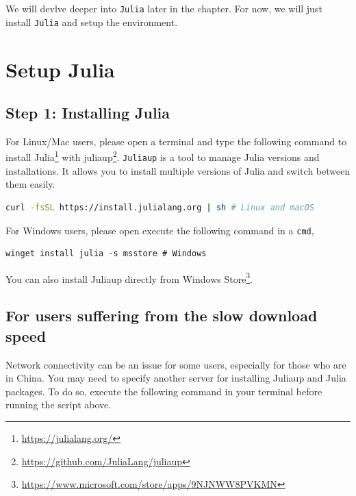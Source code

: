 \documentclass[
  notoc %
]{tufte-book}
\DeclareRobustCommand{\href}[2]{#2\footnote{\url{#1}}}
\newcommand{\passthrough}[1]{#1}
\begin{document}
We will devlve deeper into \passthrough{\lstinline!Julia!} later in the
chapter. For now, we will just install \passthrough{\lstinline!Julia!}
and setup the environment.

\hypertarget{sec:setup}{%
\section{Setup Julia}\label{sec:setup}}

\hypertarget{step-1-installing-julia}{%
\subsection{Step 1: Installing Julia}\label{step-1-installing-julia}}

For Linux/Mac users, please open a terminal and type the following
command to install \href{https://julialang.org/}{Julia} with
\href{https://github.com/JuliaLang/juliaup}{juliaup}.
\passthrough{\lstinline!Juliaup!} is a tool to manage Julia versions and
installations. It allows you to install multiple versions of Julia and
switch between them easily.

\begin{lstlisting}[language=bash]
curl -fsSL https://install.julialang.org | sh # Linux and macOS
\end{lstlisting}

For Windows users, please open execute the following command in a
\passthrough{\lstinline!cmd!},

\begin{lstlisting}
winget install julia -s msstore # Windows
\end{lstlisting}

You can also install Juliaup directly from
\href{https://www.microsoft.com/store/apps/9NJNWW8PVKMN}{Windows Store}.

\hypertarget{for-users-suffering-from-the-slow-download-speed}{%
\subsection{For users suffering from the slow download
speed}\label{for-users-suffering-from-the-slow-download-speed}}

Network connectivity can be an issue for some users, especially for
those who are in China. You may need to specify another server for
installing Juliaup and Julia packages. To do so, execute the following
command in your terminal before running the script above.
\end{document}
